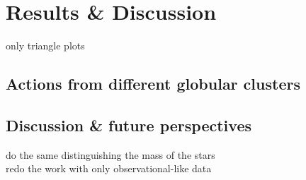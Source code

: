 \section{Results \& Discussion}
only triangle plots

\subsection{Actions from different globular clusters}
\subsection{Discussion \& future perspectives}
do the same distinguishing the mass of the stars\\
redo the work with only observational-like data